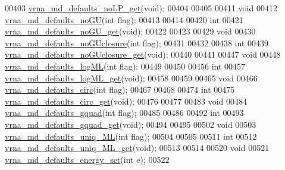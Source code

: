 \begin{DoxyCode}
00403 \hyperlink{group__model__details_ga934344888fbacaed538bbbfe910f2aa6}{vrna\_md\_defaults\_noLP\_get}(\textcolor{keywordtype}{void});
00404 
00405 
00411 \textcolor{keywordtype}{void}
00412 \hyperlink{group__model__details_ga98218f85c7a957a1d1ddf4627fdf5a39}{vrna\_md\_defaults\_noGU}(\textcolor{keywordtype}{int} flag);
00413 
00414 
00420 \textcolor{keywordtype}{int}
00421 \hyperlink{group__model__details_ga5faa7d4e536d7fe36ec25428c0cf2563}{vrna\_md\_defaults\_noGU\_get}(\textcolor{keywordtype}{void});
00422 
00423 
00429 \textcolor{keywordtype}{void}
00430 \hyperlink{group__model__details_gade5b9951d71ca2fb357a4e6c0c18ccd1}{vrna\_md\_defaults\_noGUclosure}(\textcolor{keywordtype}{int} flag);
00431 
00432 
00438 \textcolor{keywordtype}{int}
00439 \hyperlink{group__model__details_ga4f7fdad083243a5348d63320ddaa70f3}{vrna\_md\_defaults\_noGUclosure\_get}(\textcolor{keywordtype}{void});
00440 
00441 
00447 \textcolor{keywordtype}{void}
00448 \hyperlink{group__model__details_ga3de50a73455d88c3957386933b8e1f90}{vrna\_md\_defaults\_logML}(\textcolor{keywordtype}{int} flag);
00449 
00450 
00456 \textcolor{keywordtype}{int}
00457 \hyperlink{group__model__details_ga93f04e070d529c5d0bb87c9681f6ad29}{vrna\_md\_defaults\_logML\_get}(\textcolor{keywordtype}{void});
00458 
00459 
00465 \textcolor{keywordtype}{void}
00466 \hyperlink{group__model__details_ga4e1deb3e91a8a99e5c6dd905a5eb0186}{vrna\_md\_defaults\_circ}(\textcolor{keywordtype}{int} flag);
00467 
00468 
00474 \textcolor{keywordtype}{int}
00475 \hyperlink{group__model__details_gad3a7e58de344ad93a08925f58f94f6fb}{vrna\_md\_defaults\_circ\_get}(\textcolor{keywordtype}{void});
00476 
00477 
00483 \textcolor{keywordtype}{void}
00484 \hyperlink{group__model__details_ga0685ca2aeb39af76f2421fc308163dce}{vrna\_md\_defaults\_gquad}(\textcolor{keywordtype}{int} flag);
00485 
00486 
00492 \textcolor{keywordtype}{int}
00493 \hyperlink{group__model__details_gae645b8612f879eb38b45244fa9eddb9e}{vrna\_md\_defaults\_gquad\_get}(\textcolor{keywordtype}{void});
00494 
00495 
00502 \textcolor{keywordtype}{void}
00503 \hyperlink{group__model__details_ga59b944f61c5d2babec2d4c48c820de67}{vrna\_md\_defaults\_uniq\_ML}(\textcolor{keywordtype}{int} flag);
00504 
00505 
00511 \textcolor{keywordtype}{int}
00512 \hyperlink{group__model__details_gab48e70fd024bf838404bcbcca0c874a0}{vrna\_md\_defaults\_uniq\_ML\_get}(\textcolor{keywordtype}{void});
00513 
00514 
00520 \textcolor{keywordtype}{void}
00521 \hyperlink{group__model__details_ga8dd29c55787a4576277e1907e92d810c}{vrna\_md\_defaults\_energy\_set}(\textcolor{keywordtype}{int} e);
00522 

\end{DoxyCode}
